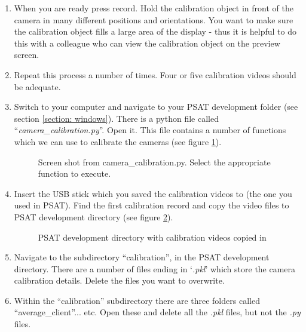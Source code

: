\documentclass[12pt,a4paper]{report}
\begin{document}
	
	\begin{enumerate}
		\item When you are ready press record. Hold the calibration object in front of the camera in many different positions and orientations. You want to make sure the calibration object fills a large area of the display - thus it is helpful to do this with a colleague who can view the calibration object on the preview screen.
		
		\item Repeat this process a number of times. Four or five calibration videos should be adequate.
		
		\item Switch to your computer and navigate to your PSAT development folder (see section \ref{section: windows}). There is a python file called ``\textit{camera\_calibration.py}''. Open it. This file contains a number of functions which we can use to calibrate the cameras (see figure \ref{figure: camera_calibration.py}).
		
		\begin{figure}[h]					
			\centering
			\caption{Screen shot from camera\_calibration.py. Select the appropriate function to execute.}
			\label{figure: camera_calibration.py}	
		\end{figure}
	
		\FloatBarrier
		
		\item Insert the USB stick which you saved the calibration videos to (the one you used in PSAT). Find the first calibration record and copy the video files to PSAT development directory (see figure \ref{figure: camera_calibration directory}).
		
		\begin{figure}[h]					
			\centering
			\caption{PSAT development directory with calibration videos copied in}
			\label{figure: camera_calibration directory}	
		\end{figure}
		
		\FloatBarrier
		
		\item Navigate to the subdirectory ``calibration'', in the PSAT development directory. There are a number of files ending in `\textit{.pkl}' which store the camera calibration details. Delete the files you want to overwrite. 
		
		\item Within the ``calibration'' subdirectory there are three folders called ``average\_client''... etc. Open these and delete all the \textit{.pkl} files, but not the \textit{.py} files.
		

\end{enumerate}
\end{document}
